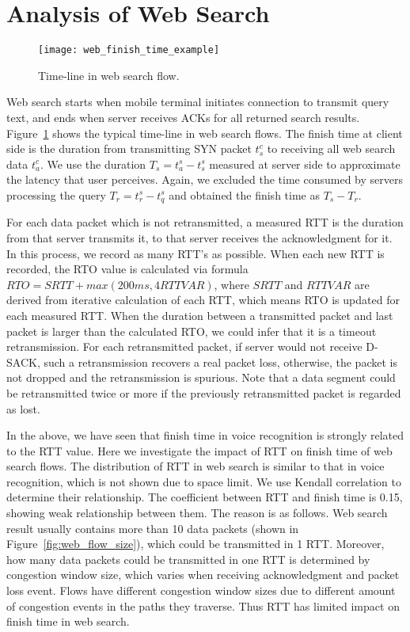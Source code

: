 
\section{Analysis of Web Search}
\label{sec:web_search}

\begin{figure}[th]
\centering
	\texttt{[image: web\_finish\_time\_example]}
\caption{Time-line in web search flow.}
\label{fig:web_finish_time_example}
\end{figure}

Web search starts when mobile terminal initiates connection to transmit query text, and ends when server receives ACKs for all returned search results. Figure~\ref{fig:web_finish_time_example} shows the typical time-line in web search flows. The finish time at client side is the duration from transmitting SYN packet $t^c_s$ to receiving all web search data $t^c_a$. We use the duration $T_s=t^s_a - t^s_s$ measured at server side to approximate the latency that user perceives. Again, we excluded the time consumed by servers processing the query $T_r=t^s_r - t^s_q$ and obtained the finish time as $T_s-T_r$.

For each data packet which is not retransmitted, a measured RTT is the duration from that server transmits it, to that server receives the acknowledgment for it. In this process, we record as many RTT's as possible. When each new RTT is recorded, the RTO value is calculated via formula $RTO = SRTT + max(200ms, 4 RTTVAR)$, where $SRTT$ and $RTTVAR$ are derived from iterative calculation of each RTT, which means RTO is updated for each measured RTT. When the duration between a transmitted packet and last packet is larger than the calculated RTO, we could infer that it is a timeout retransmission. For each retransmitted packet, if server would not receive D-SACK, such a retransmission recovers a real packet loss, otherwise, the packet is not dropped and the retransmission is spurious. Note that a data segment could be retransmitted twice or more if the previously retransmitted packet is regarded as lost.

In the above, we have seen that finish time in voice recognition is strongly related to the RTT value. Here we investigate the impact of RTT on finish time of web search flows. The distribution of RTT in web search is similar to that in voice recognition, which is not shown due to space limit. We use Kendall correlation to determine their relationship. The coefficient between RTT and finish time is 0.15, showing weak relationship between them. The reason is as follows. Web search result usually contains more than 10 data packets (shown in Figure~\ref{fig:web_flow_size}), which could be transmitted in 1 RTT. Moreover, how many data packets could be transmitted in one RTT is determined by congestion window size, which varies when receiving acknowledgment and packet loss event. Flows have different congestion window sizes due to different amount of congestion events in the paths they traverse. Thus RTT has limited impact on finish time in web search. 

